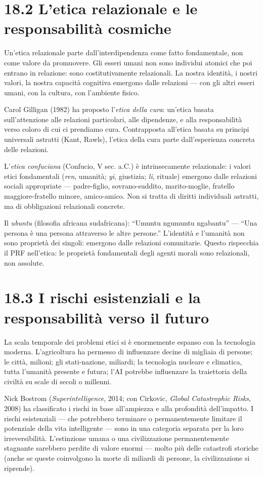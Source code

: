 \documentclass[11.5pt,a4paper,openany]{book}
\theoremstyle{remark}
\begin{document}
\section{18.2 L'etica relazionale e le responsabilità cosmiche}

Un'etica relazionale parte dall'interdipendenza come fatto fondamentale, non come valore da promuovere. Gli esseri umani non sono individui atomici che poi entrano in relazione: sono costitutivamente relazionali. La nostra identità, i nostri valori, la nostra capacità cognitiva emergono dalle relazioni --- con gli altri esseri umani, con la cultura, con l'ambiente fisico.

Carol Gilligan (1982) ha proposto l'\textit{etica della cura}: un'etica basata sull'attenzione alle relazioni particolari, alle dipendenze, e alla responsabilità verso coloro di cui ci prendiamo cura. Contrapposta all'etica basata su principi universali astratti (Kant, Rawls), l'etica della cura parte dall'esperienza concreta delle relazioni.

L'\textit{etica confuciana} (Confucio, V sec. a.C.) è intrinsecamente relazionale: i valori etici fondamentali (\textit{ren}, umanità; \textit{yi}, giustizia; \textit{li}, rituale) emergono dalle relazioni sociali appropriate --- padre-figlio, sovrano-suddito, marito-moglie, fratello maggiore-fratello minore, amico-amico. Non si tratta di diritti individuali astratti, ma di obbligazioni relazionali concrete.

Il \textit{ubuntu} (filosofia africana sudafricana): ``Umuntu ngumuntu ngabantu'' --- ``Una persona è una persona attraverso le altre persone.'' L'identità e l'umanità non sono proprietà dei singoli: emergono dalle relazioni comunitarie. Questo rispecchia il PRF nell'etica: le proprietà fondamentali degli agenti morali sono relazionali, non assolute.

\section{18.3 I rischi esistenziali e la responsabilità verso il futuro}

La scala temporale dei problemi etici si è enormemente espanso con la tecnologia moderna. L'agricoltura ha permesso di influenzare decine di migliaia di persone; le città, milioni; gli stati-nazione, miliardi; la tecnologia nucleare e climatica, tutta l'umanità presente e futura; l'AI potrebbe influenzare la traiettoria della civiltà su scale di secoli o millenni.

Nick Bostrom (\textit{Superintelligence}, 2014; con Cirkovic, \textit{Global Catastrophic Risks}, 2008) ha classificato i rischi in base all'ampiezza e alla profondità dell'impatto. I rischi esistenziali --- che potrebbero terminare o permanentemente limitare il potenziale della vita intelligente --- sono in una categoria separata per la loro irreversibilità. L'estinzione umana o una civilizzazione permanentemente stagnante sarebbero perdite di valore enormi --- molto più delle catastrofi storiche (anche se queste coinvolgono la morte di miliardi di persone, la civilizzazione si riprende).
\end{document}
